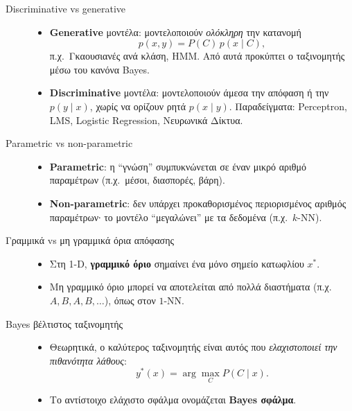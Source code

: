\documentclass[a4paper,11pt]{article}
\begin{document}
\begin{description}
  \item[Discriminative vs generative]
    \begin{itemize}
      \item \textbf{Generative} μοντέλα: μοντελοποιούν \emph{ολόκληρη} την κατανομή
            \[
              p(x,y) = P(C)\,p(x\mid C),
            \]
            π.χ.\ Γκαουσιανές ανά κλάση, HMM. Από αυτά
            προκύπτει ο ταξινομητής μέσω του κανόνα Bayes.
      \item \textbf{Discriminative} μοντέλα: μοντελοποιούν άμεσα την απόφαση
            ή την $p(y\mid x)$, χωρίς να ορίζουν ρητά $p(x\mid y)$.
            Παραδείγματα: Perceptron, LMS, Logistic Regression, Νευρωνικά Δίκτυα.
    \end{itemize}

  \item[Parametric vs non-parametric]
    \begin{itemize}
      \item \textbf{Parametric}: η ``γνώση'' συμπυκνώνεται σε έναν μικρό
            αριθμό παραμέτρων (π.χ.\ μέσοι, διασπορές, βάρη).
      \item \textbf{Non-parametric}: δεν υπάρχει προκαθορισμένος περιορισμένος
            αριθμός παραμέτρων∙ το μοντέλο ``μεγαλώνει'' με τα δεδομένα (π.χ.\ $k$-NN).
    \end{itemize}

  \item[Γραμμικά vs μη γραμμικά όρια απόφασης]
    \begin{itemize}
      \item Στη 1-D, \textbf{γραμμικό όριο} σημαίνει ένα μόνο σημείο κατωφλίου $x^\ast$.
      \item Μη γραμμικό όριο μπορεί να αποτελείται από πολλά διαστήματα
            (π.χ.\ $A,B,A,B,\dots$), όπως στον $1$-NN.
    \end{itemize}

  \item[Bayes βέλτιστος ταξινομητής]
    \begin{itemize}
      \item Θεωρητικά, ο καλύτερος ταξινομητής είναι αυτός που
            \emph{ελαχιστοποιεί την πιθανότητα λάθους}:
            \[
              y^\ast(x) = \arg\max_{C} P(C\mid x).
            \]
      \item Το αντίστοιχο ελάχιστο σφάλμα ονομάζεται \textbf{Bayes σφάλμα}.
    \end{itemize}
\end{description}
\end{document}
